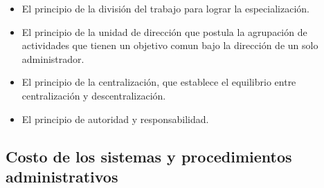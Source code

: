 \documentclass[a4paper, 11pt, oneside]{article}
\begin{document}
\begin{itemize}
	\item El principio de la división del trabajo para lograr la especialización.
	\item El principio de la unidad de dirección que postula la agrupación de actividades que tienen un objetivo comun bajo la dirección
	      de un solo administrador.
	\item El principio de la centralización, que establece el equilibrio entre centralización y descentralización.
	\item El principio de autoridad y responsabilidad.
\end{itemize}

\subsection{Costo de los sistemas y procedimientos administrativos}

\subsection{}
\end{document}
